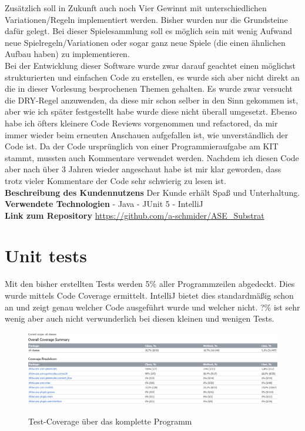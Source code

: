 \documentclass[12pt]{article}
\begin{document}
Zusätzlich soll in Zukunft auch noch Vier Gewinnt mit unterschiedlichen Variationen/Regeln implementiert werden. Bisher wurden nur die Grundsteine dafür gelegt. Bei dieser Spielesammlung soll es möglich sein mit wenig Aufwand neue Spielregeln/Variationen oder sogar ganz neue Spiele (die einen ähnlichen Aufbau haben) zu implementieren.
\\

Bei der Entwicklung dieser Software wurde zwar darauf geachtet einen möglichst strukturierten und einfachen Code zu erstellen,
es wurde sich aber nicht direkt an die in dieser Vorlesung besprochenen Themen gehalten. Es wurde zwar versucht die DRY-Regel anzuwenden, 
da diese mir schon selber in den Sinn gekommen ist, aber wie ich später festgestellt habe wurde diese nicht überall umgesetzt. Ebenso habe ich öfters kleinere Code Reviews vorgenommen und refactored, da mir immer wieder beim erneuten Anschauen aufgefallen ist, wie unverständlich der Code ist. Da der Code ursprünglich von einer Programmieraufgabe am KIT stammt, mussten auch Kommentare verwendet werden. Nachdem ich diesen Code aber nach über 3 Jahren wieder angeschaut habe ist mir klar geworden, dass trotz vieler Kommentare der Code sehr schwierig zu lesen ist.
\\ 

\noindent  \textbf{Beschreibung des Kundennutzens}
Der Kunde erhält Spaß und Unterhaltung.
\\

\noindent \textbf{Verwendete Technologien}
- Java
- JUnit 5
- IntelliJ
\\

\noindent \textbf{Link zum Repository}
\url{https://github.com/a-schmider/ASE_Substrat}





\newpage
\section{Unit tests}
Mit den bisher erstellten Tests werden 5\% aller Programmzeilen abgedeckt. Dies wurde mittels Code Coverage ermittelt. IntelliJ bietet dies standardmäßig schon an und zeigt genau welcher Code ausgeführt wurde und welcher nicht. ?\% ist sehr wenig aber auch nicht verwunderlich bei diesen kleinen und wenigen Tests. 

\begin{figure}[H]
\centering
{\includegraphics[width=13cm]{Bilder/CoverageAll}}
\caption{Test-Coverage über das komplette Programm}
\label{fig:CoverageAll}
\end{figure}
\end{document}
